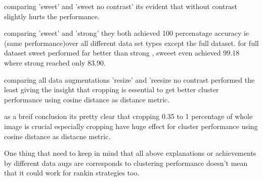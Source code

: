  comparing 'sweet' and 'sweet no contrast' its evident that without contrast slightly hurts the performance.

comparing 'sweet' and 'strong' they both achieved 100 percenatage accuracy ie (same performance)over all different data set types except the full dataset.
for full dataset sweet performed far better than strong , sweeet even achieved 99.18 where strong reached only 83.90.

comparing all data augmentations 'resize' and 'reesize no contrast performed the least giving the insight that cropping is essential to get better cluster performance
 using cosine distance as distance metric.

 as a breif conclusion its pretty clear that cropping 0.35 to 1 percentage of whole image is crucial especially cropping have huge effect for cluster performance using cosine distance as distacne metric.

 One thing that need to keep in mind that all above explanations or achievements by different data augs are corresponds to clustering performance doesn't mean that
  it could work for rankin strategies too.
    
  \begin{table}[H]
    \centering
    \caption{Evaluation Results on Different Datasets and Augmentations with euclidean distance}
    \label{tab:evaluation_results_euclidean}
\end{table}

